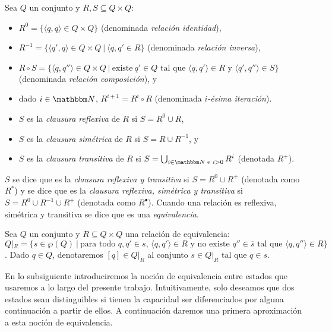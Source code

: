 \begin{definition} 
Sea $Q$ un conjunto y $R, S \subseteq Q \times Q$:
\begin{itemize}
\item $R^0 = \{\langle q, q \rangle \in Q \times Q\}$ (denominada \emph{relación identidad}),
\item $R^{-1} = \{\langle q', q \rangle \in Q \times Q\ |\ \langle q, q' \in R\}$ (denominada \emph{relación inversa}), 
\item $R \circ S = \{\langle q, q'' \rangle \in Q \times Q\ |\ \text{existe} \ q' \in Q \text{ tal que } \langle q, q' \rangle \in R \text{ y } \langle q', q'' \rangle \in S\}$ (denominada \emph{relación composición}), y
\item dado $i \in \nat$, $R^{i+1} = R^{i} \circ R$ (denominada \emph{$i$-ésima iteración}).
\end{itemize}
\begin{itemize}
    \item $S$ es la \emph{clausura reflexiva} de $R$ si $S = R^0 \cup R$,
    \item $S$ es la \emph{clausura simétrica} de $R$ si $S = R \cup R^{-1}$, y
    \item $S$ es la \emph{clausura transitiva} de $R$ si $S = \bigcup_{i \in \nat \text{ e } i > 0} R^i$ (denotada $R^+$).
\end{itemize}
$S$ se dice que es la \emph{clausura reflexiva y transitiva} si $S = R^0 \cup R^+$ (denotada como $R^*$) y se dice que es la \emph{clausura reflexiva, simétrica y transitiva} si $S = R^0 \cup R^{-1} \cup R^+$ (denotada como $R^\bullet$). Cuando una relación es reflexiva, simétrica y transitiva se dice que es una \emph{equivalencia}.
\end{definition}

\begin{definition}
Sea $Q$ un conjunto y $R \subseteq Q \times Q$ una relación de equivalencia:
$Q|_R = \{s \in \wp(Q)\ |\ \text{para todo } q, q' \in s \text{, } \langle q, q' \rangle \in R \text{ y no existe } q'' \in \overline{s} \text{ tal que } \langle q, q'' \rangle \in R\}$. Dado $q \in Q$, denotaremos $[q] \in Q|_R$ al conjunto $s \in Q|_R$ tal que $q \in s$. 
\end{definition}

En lo subsiguiente introduciremos la noción de equivalencia entre estados que usaremos a lo largo del presente trabajo. Intuitivamente, solo deseamos que dos estados sean distinguibles si tienen la capacidad ser diferenciados por alguna continuación a partir de ellos. A continuación daremos una primera aproximación a esta noción de equivalencia.

